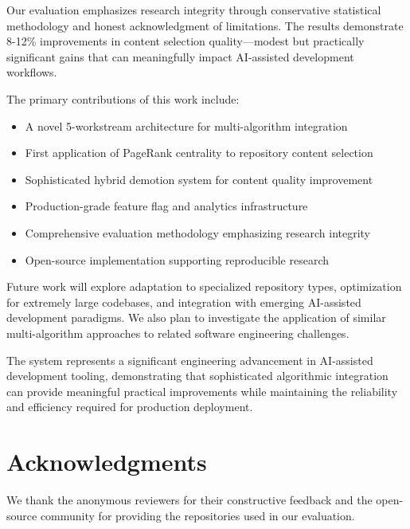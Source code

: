\documentclass[conference]{IEEEtran}
\begin{document}
Our evaluation emphasizes research integrity through conservative statistical methodology and honest acknowledgment of limitations. The results demonstrate 8-12\% improvements in content selection quality—modest but practically significant gains that can meaningfully impact AI-assisted development workflows.

The primary contributions of this work include:

\begin{itemize}
\item A novel 5-workstream architecture for multi-algorithm integration
\item First application of PageRank centrality to repository content selection
\item Sophisticated hybrid demotion system for content quality improvement
\item Production-grade feature flag and analytics infrastructure
\item Comprehensive evaluation methodology emphasizing research integrity
\item Open-source implementation supporting reproducible research
\end{itemize}

Future work will explore adaptation to specialized repository types, optimization for extremely large codebases, and integration with emerging AI-assisted development paradigms. We also plan to investigate the application of similar multi-algorithm approaches to related software engineering challenges.

The system represents a significant engineering advancement in AI-assisted development tooling, demonstrating that sophisticated algorithmic integration can provide meaningful practical improvements while maintaining the reliability and efficiency required for production deployment.

\section*{Acknowledgments}

We thank the anonymous reviewers for their constructive feedback and the open-source community for providing the repositories used in our evaluation.
\end{document}
